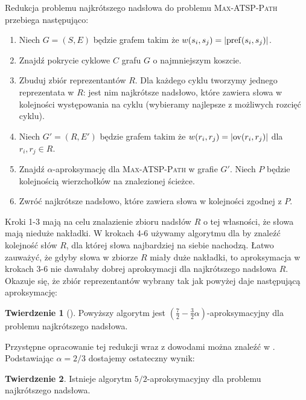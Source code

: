\documentclass[a4paper,12pt]{article}
\DeclareMathOperator\ov{ov}
\DeclareMathOperator\pref{pref}
\DeclarePairedDelimiter\abs{|}{|}
\theoremstyle{definition}
\newtheorem{theorem}{Twierdzenie}
\begin{document}
Redukcja problemu najkrótszego nadsłowa do problemu \textsc{Max-ATSP-Path} przebiega następująco:
\begin{enumerate}[noitemsep]
	\item Niech $G = (S, E)$ będzie grafem takim że $w(s_i, s_j) = \abs{\pref(s_i, s_j)}$.
	\item Znajdź pokrycie cyklowe $C$ grafu $G$ o najmniejszym koszcie.
	\item Zbuduj zbiór reprezentantów $R$. Dla każdego cyklu tworzymy jednego reprezentata w $R$: jest nim najkrótsze nadsłowo, które zawiera słowa w kolejności występowania na cyklu (wybieramy najlepsze z możliwych rozcięć cyklu).
	\item Niech $G' = (R, E')$ będzie grafem takim że $w(r_i, r_j) = \abs{\ov(r_i, r_j)}$ dla $r_i, r_j \in R$.
	\item Znajdź $\alpha$-aproksymację dla \textsc{Max-ATSP-Path} w grafie $G'$. Niech $P$ będzie kolejnością wierzchołków na znalezionej ścieżce.
	\item Zwróć najkrótsze nadsłowo, które zawiera słowa w kolejności zgodnej z $P$.
\end{enumerate}

Kroki 1-3 mają na celu znalazienie zbioru nadsłów $R$ o tej własności, że słowa mają nieduże nakładki. W krokach 4-6 używamy algorytmu dla  by znaleźć kolejność słów $R$, dla której słowa najbardziej na siebie nachodzą. Łatwo zauważyć, że gdyby słowa w zbiorze $R$ miały duże nakładki, to aproksymacja w krokach 3-6 nie dawałaby dobrej aproksymacji dla najkrótszego nadsłowa $R$. Okazuje się, że zbiór reprezentantów  wybrany tak jak powyżej daje następującą aproksymację:
\begin{theorem}[\cite{Breslauer1997,Mucha2007}]
  Powyższy algorytm jest $\left(\frac{7}{2}-\frac{3}{2}\alpha\right)$-aproksymacyjny dla problemu najkrótszego nadsłowa.
\end{theorem}

Przystępne opracowanie tej redukcji wraz z dowodami można znaleźć w \cite{Mucha2007}. Podstawiając $\alpha = 2/3$ dostajemy ostateczny wynik:

\begin{theorem}
  Istnieje algorytm $5/2$-aproksymacyjny dla problemu najkrótszego nadsłowa.
\end{theorem}

\begin{thebibliography}{}
\end{thebibliography}
\end{document}
